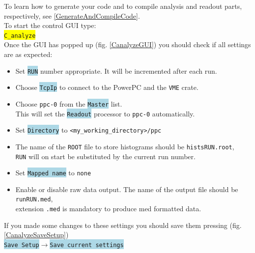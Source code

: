 \documentclass[10pt]{article}
\newcommand{\blue}[1]{\colorbox{lightblue}{\texttt{#1}}}
\newcommand{\yellow}[1]{\colorbox{yellow}{\texttt{#1}}}
\begin{document}
To learn how to generate your code and to compile analysis and readout parts, respectively, see \ref{GenerateAndCompileCode}.\\

To start the control GUI type:\\

\hspace*{.2\linewidth}\yellow{C\_analyze}\\

Once the GUI has popped up (fig. \ref{CanalyzeGUI}) you should check if all settings are as expected:\\
\begin{center}
\begin{itemize}
\setlength{\rightmargin}{1em}%
\setlength{\leftmargin}{2em}%
\setlength{\itemsep}{0pt}%
\setlength{\parskip}{1mm}%
\setlength{\partopsep}{0pt}%
\setlength{\parsep}{0pt}%
\setlength{\topsep}{0pt}%
\item	Set \blue{RUN} number appropriate. It will be incremented after each run.
\item	Choose \blue{TcpIp} to connect to the PowerPC and the \texttt{VME} crate.
\item	Choose \texttt{ppc-0} from the \blue{Master} list.\\
	This will set the \blue{Readout} processor to \texttt{ppc-0} automatically.
\item	Set \blue{Directory} to \texttt{<my\_working\_directory>/ppc}
\item	The name of the \texttt{ROOT} file to store histograms should be \texttt{histsRUN.root},\\
	\texttt{RUN} will on start be substituted by the current run number.
\item	Set \blue{Mapped name} to \texttt{none}
\item	Enable or disable raw data output. The name of the output file should be \texttt{runRUN.med},\\
	extension \texttt{.med} is mandatory to produce med formatted data.
\end{itemize}
\end{center}

If you made some changes to these settings you should save them pressing (fig. \ref{CanalyzeSaveSetup})\\

\hspace*{.2\linewidth}\blue{Save Setup}$\rightarrow$\blue{Save current settings}\\
\end{document}
